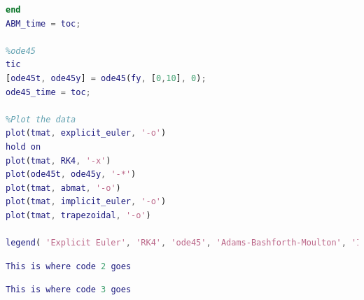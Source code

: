 \documentclass[11pt]{article}
\begin{document}
\begin{lstlisting}[language=Matlab]
end
ABM_time = toc;

%ode45
tic
[ode45t, ode45y] = ode45(fy, [0,10], 0);
ode45_time = toc;

%Plot the data
plot(tmat, explicit_euler, '-o')
hold on
plot(tmat, RK4, '-x')
plot(ode45t, ode45y, '-*')
plot(tmat, abmat, '-o')
plot(tmat, implicit_euler, '-o')
plot(tmat, trapezoidal, '-o')

legend( 'Explicit Euler', 'RK4', 'ode45', 'Adams-Bashforth-Moulton', 'Implicit Euler', 'Trapezoidal')

\end{lstlisting} 

\begin{lstlisting}[language=Matlab]
This is where code 2 goes
\end{lstlisting} 

\begin{lstlisting}[language=Matlab]
This is where code 3 goes
\end{lstlisting} 
\end{document}
